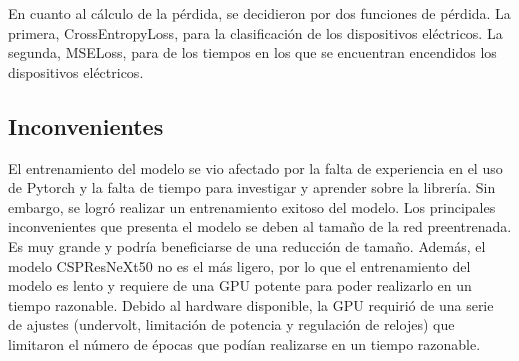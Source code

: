 En cuanto al cálculo de la pérdida, se decidieron por dos funciones de pérdida. La primera, CrossEntropyLoss, para la clasificación de los dispositivos eléctricos. La segunda, MSELoss, para  de los tiempos en los que se encuentran encendidos los dispositivos eléctricos.

\subsection{Inconvenientes}
El entrenamiento del modelo se vio afectado por la falta de experiencia en el uso de Pytorch y la falta de tiempo para investigar y aprender sobre la librería. Sin embargo, se logró realizar un entrenamiento exitoso del modelo.
Los principales inconvenientes que presenta el modelo se deben al tamaño de la red preentrenada. Es muy grande y podría beneficiarse de una reducción de tamaño. Además, el modelo CSPResNeXt50 no es el más ligero, por lo que el entrenamiento del modelo es lento y requiere de una GPU potente para poder realizarlo en un tiempo razonable.
Debido al hardware disponible, la GPU requirió de una serie de ajustes (undervolt, limitación de potencia y regulación de relojes) que limitaron el número de épocas que podían realizarse en un tiempo razonable.
